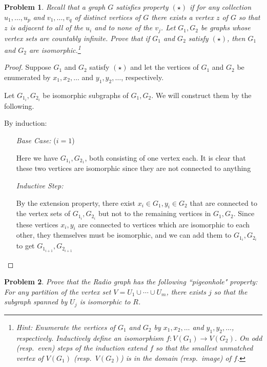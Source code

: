 \documentclass[11pt]{article}
\newtheorem{problem}{Problem}
\begin{document}
\pagebreak

\begin{problem}
Recall that a graph $G$ satisfies property $(\star)$ if for any collection $u_1,\ldots,u_p$ and $v_1,\ldots,v_q$ of distinct vertices of $G$ there exists a vertex $z$ of $G$ so that $z$ is adjacent to all of the $u_i$ and to none of the $v_j$. Let $G_1,G_2$ be graphs whose vertex sets are countably infinite. Prove that if $G_1$ and $G_2$ satisfy $(\star)$, then $G_1$ and $G_2$ are isomorphic.\footnote{Hint: Enumerate the vertices of $G_1$ and $G_2$ by $x_1,x_2,\ldots$ and $y_1,y_2,\ldots$, respectively. Inductively define an isomorphism $f:V(G_1)\rightarrow V(G_2)$. On odd (resp.\ even) steps of the induction extend $f$ so that the smallest unmatched vertex of $V(G_1)$ (resp.\ $V(G_2)$) is in the domain (resp.\ image) of $f$.}
\end{problem}

\begin{proof}
Suppose $G_1$ and $G_2$ satisfy $(\star)$ and let the  vertices of $G_1$ and $G_2$ be enumerated by $x_1,x_2,\ldots$ and $y_1,y_2,\ldots$, respectively.

Let \(G_{1_i}, G_{2_i}\) be isomorphic subgraphs of \(G_1, G_2\). We will construct them by the following.

By induction:
\begin{enumerate}[align=left]
	\item[\emph{Base Case:}] (\(i = 1\))
	
	Here we have \(G_{1_1}, G_{2_1}\), both consisting of one vertex each. It is clear that these two vertices are isomorphic since they are not connected to anything
	\item[\emph{Inductive Step:}]  

	By the extension property, there exist \(x_{i} \in G_1, y_{i} \in G_2\) that are connected to the vertex sets of \(G_{1_i}, G_{2_i}\) but not to the remaining vertices in \(G_1, G_2\). Since these vertices \(x_i, y_i\) are connected to vertices which are isomorphic to each other, they themselves must be isomorphic, and we can add them to \(G_{1_i}, G_{2_i}\) to get \(G_{1_{i+1}}, G_{2_{i+1}}\)
\end{enumerate} 

\end{proof}

\pagebreak

\begin{problem}
Prove that the Radio graph has the following ``pigeonhole" property: For any partition of the vertex set $V=U_1\cup\cdots\cup U_m$, there exists $j$ so that the subgraph spanned by $U_j$ is isomorphic to $R$. 
\end{problem}
\end{document}
